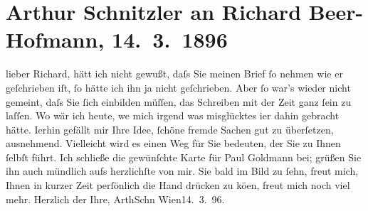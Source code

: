 

         
         \renewcommand{\erwaehntePersonen}{Personen: Richard Beer-Hofmann, Paul Goldmann}
         \renewcommand{\erwaehnteOrte}{Orte: Wien}
         \renewcommand{\erwaehnteWerke}{}
               \section[Arthur Schnitzler an Richard Beer-Hofmann, 14. 3. 1896]{ Arthur Schnitzler an Richard Beer-Hofmann, 14. 3. 1896}\nopagebreak{}\rehead{ }\begin{ledgroupsized}[t]{13cm}\normalsize\beginnumbering \toendnotes[C]{\smallbreak\pagebreak[2]} 
\pstart
           \noindent{}{\pb}lieber Richard, hätt ich nicht gewußt, daſs Sie meinen Brief ſo
               nehmen wie er geſchrieben iſt, ſo hätte ich ihn ja nicht geſchrieben. Aber ſo war’s
               wieder nicht gemeint, daſs Sie ſich einbilden \introOben{}müſſen\introOben{}, das
               Schreiben mit der Zeit ganz ſein zu laſſen. Wo wär ich heute, we{\geminationn} mich irgend was misglücktes i{\geminationm}er dahin gebracht hätte. I{\geminationm}erhin gefällt mir Ihre Idee, ſchöne fremde Sachen gut zu überſetzen, ausnehmend.
               Vielleicht wird es einen Weg für Sie bedeuten, der Sie zu Ihnen ſelbſt führt.\pend
           \pstart
           {\pb}Ich schließe die gewünſchte Karte für Paul Goldmann bei; grüßen Sie ihn auch mündlich
               aufs herzlichſte von mir. Sie bald im Bild zu ſehn, freut mich, Ihnen in kurzer Zeit
               perſönlich die Hand drücken zu kö{\geminationn}en, freut mich noch
               viel mehr.\pend
           \pstart Herzlich der Ihre, \spacefill\mbox{ArthSchn}\pend{}\pstart
           Wien14. 3. 96.\pend
           
         
         \endnumbering{}\end{ledgroupsized}  \newcommand{\dateiname}{L00539}\newcommand{\titel}{Arthur Schnitzler an Richard Beer-Hofmann, 14. 3. 1896}\newcommand{\editorInnen}{Martin Anton Müller und Gerd-Hermann Susen}
      